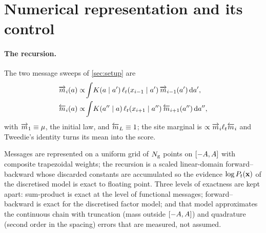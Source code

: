 \section{Numerical representation and its control}
\label{app:numerics}
\paragraph{The recursion.}
The two message sweeps of \cref{sec:setup} are
\begin{equation}
\begin{aligned}
  \overrightarrow{m}_i(a)&\propto\!\int\!K(a\mid a')\,\ell_t(x_{i-1}\mid a')\,\overrightarrow{m}_{i-1}(a')\,\mathrm{d} a',\\
  \overleftarrow{m}_i(a)&\propto\!\int\!K(a''\mid a)\,\ell_t(x_{i+1}\mid a'')\,\overleftarrow{m}_{i+1}(a'')\,\mathrm{d} a'',
\end{aligned}
\label{eq:bp}
\end{equation}
with $\overrightarrow{m}_1\equiv\mu$, the initial law, and $\overleftarrow{m}_{L}\equiv1$; the site marginal is $\propto\overrightarrow{m}_i\ell_t\overleftarrow{m}_i$
and Tweedie's identity turns its mean into the score.



Messages are represented on a uniform grid of $N_{\mathrm{g}}$ points on
$[-A,A]$ with composite trapezoidal weights; the recursion is a scaled
linear-domain forward--backward whose discarded constants are accumulated so the
evidence $\log P_t(\mathbf{x})$ of the discretised model is exact to floating point. Three
levels of exactness are kept apart: sum-product is exact at the level of functional
messages; forward--backward is exact for the discretised factor model; and that model
approximates the continuous chain with truncation (mass outside $[-A,A]$)
and quadrature (second order in the spacing) errors that are measured, not assumed.

